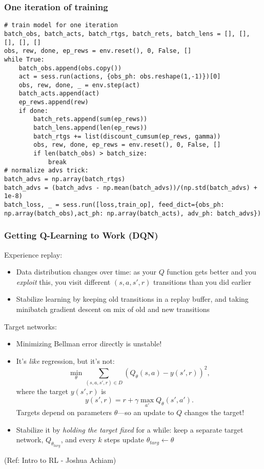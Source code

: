 \begin{frame}[fragile]\frametitle{One iteration of training}
\begin{lstlisting}
# train model for one iteration
batch_obs, batch_acts, batch_rtgs, batch_rets, batch_lens = [], [], [], [], []
obs, rew, done, ep_rews = env.reset(), 0, False, []
while True:
    batch_obs.append(obs.copy())
    act = sess.run(actions, {obs_ph: obs.reshape(1,-1)})[0]
    obs, rew, done, _ = env.step(act)
    batch_acts.append(act)
    ep_rews.append(rew)
    if done:
        batch_rets.append(sum(ep_rews))
        batch_lens.append(len(ep_rews))
        batch_rtgs += list(discount_cumsum(ep_rews, gamma))
        obs, rew, done, ep_rews = env.reset(), 0, False, []
        if len(batch_obs) > batch_size:
            break
# normalize advs trick:
batch_advs = np.array(batch_rtgs)
batch_advs = (batch_advs - np.mean(batch_advs))/(np.std(batch_advs) + 1e-8)
batch_loss, _ = sess.run([loss,train_op], feed_dict={obs_ph: np.array(batch_obs),act_ph: np.array(batch_acts), adv_ph: batch_advs})
\end{lstlisting}


\end{frame}

\begin{frame}[fragile]\frametitle{Getting Q-Learning to Work (DQN)}

Experience replay:
\begin{itemize}
\item Data distribution changes over time: as your $Q$ function gets better and you \textit{exploit} this, you visit different $(s,a,s',r)$ transitions than you did earlier
\item Stabilize learning by keeping old transitions in a replay buffer, and taking minibatch gradient descent on mix of old and new transitions
\end{itemize}
Target networks:
\begin{itemize}
\item Minimizing Bellman error directly is unstable! 
\item It's \textit{like} regression, but it's not:
%
\begin{equation*}
\min_{\theta} \sum_{(s,a,s',r)\in D} \left(Q_{\theta}(s,a) - y(s',r) \right)^2,
\end{equation*}
%
where the target $y(s',r)$ is
%
\begin{equation*}
y(s',r) = r + \gamma \max_{a'} Q_{\theta}(s',a').
\end{equation*}
%
Targets depend on parameters $\theta$---so an update to $Q$ changes the target!
\item Stabilize it by \textit{holding the target fixed} for a while: keep a separate target network, $Q_{\theta_{targ}}$, and every $k$ steps update $\theta_{targ} \leftarrow \theta$
\end{itemize}
{\tiny (Ref: Intro to RL - Joshua Achiam)}


\end{frame}

